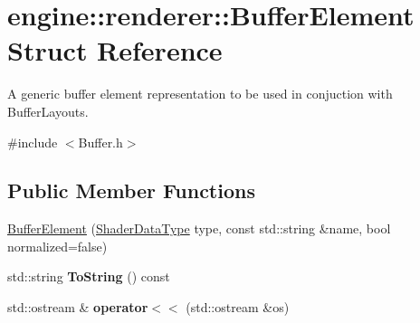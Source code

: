 \hypertarget{structengine_1_1renderer_1_1BufferElement}{}\section{engine\+:\+:renderer\+:\+:Buffer\+Element Struct Reference}
\label{structengine_1_1renderer_1_1BufferElement}


A generic buffer element representation to be used in conjuction with Buffer\+Layouts.  




{\ttfamily \#include $<$Buffer.\+h$>$}

\subsection*{Public Member Functions}
\begin{DoxyCompactItemize}
\item 
\hyperlink{structengine_1_1renderer_1_1BufferElement_a76049a787d70b0adf984e65a9994bc1d}{Buffer\+Element} (\hyperlink{Buffer_8h_a8d90f87a6e9335927edd305c1e1345c1}{Shader\+Data\+Type} type, const std\+::string \&name, bool normalized=false)
\item 
\mbox{\label{structengine_1_1renderer_1_1BufferElement_a577994a84ccd055e3ec24655bb011689}} 
std\+::string {\bfseries To\+String} () const
\item 
\mbox{\label{structengine_1_1renderer_1_1BufferElement_abf7ee73bd035e7090ea79924370fdef8}} 
std\+::ostream \& {\bfseries operator$<$$<$} (std\+::ostream \&os)
\end{DoxyCompactItemize}
